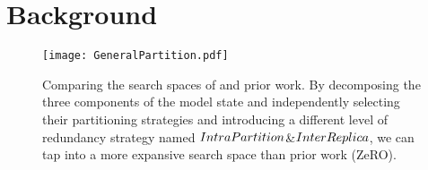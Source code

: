 \section{Background}
\label{sec_motivation}



\begin{figure}[t]
    \centering
    \texttt{[image: GeneralPartition.pdf]}
    \caption{Comparing the search spaces of \SysName and prior work. By decomposing the three components of the model state and independently selecting their partitioning strategies and introducing a different level of redundancy strategy named $Intra{\-}Partition$\&$Inter{\-}Replica$, we can tap into a more expansive search space than prior work (ZeRO).}
    \label{GeneralPartition}
\end{figure}







